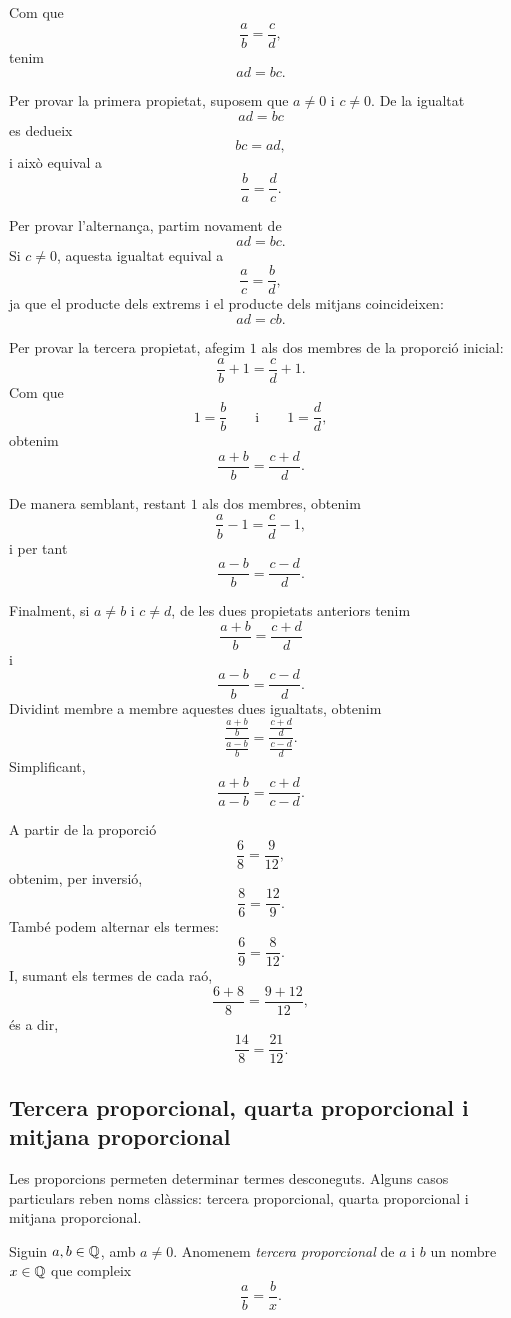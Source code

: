 \begin{prova}
Com que
\[
	\frac{a}{b}=\frac{c}{d},
\]
tenim
\[
	ad=bc.
\]

Per provar la primera propietat, suposem que \(a\neq0\) i \(c\neq0\). De la igualtat
\[
	ad=bc
\]
es dedueix
\[
	bc=ad,
\]
i això equival a
\[
	\frac{b}{a}=\frac{d}{c}.
\]

Per provar l'alternança, partim novament de
\[
	ad=bc.
\]
Si \(c\neq0\), aquesta igualtat equival a
\[
	\frac{a}{c}=\frac{b}{d},
\]
ja que el producte dels extrems i el producte dels mitjans coincideixen:
\[
	ad=cb.
\]

Per provar la tercera propietat, afegim \(1\) als dos membres de la proporció inicial:
\[
	\frac{a}{b}+1=\frac{c}{d}+1.
\]
Com que
\[
	1=\frac{b}{b}
	\qquad\text{i}\qquad
	1=\frac{d}{d},
\]
obtenim
\[
	\frac{a+b}{b}=\frac{c+d}{d}.
\]

De manera semblant, restant \(1\) als dos membres, obtenim
\[
	\frac{a}{b}-1=\frac{c}{d}-1,
\]
i per tant
\[
	\frac{a-b}{b}=\frac{c-d}{d}.
\]

Finalment, si \(a\neq b\) i \(c\neq d\), de les dues propietats anteriors tenim
\[
	\frac{a+b}{b}=\frac{c+d}{d}
\]
i
\[
	\frac{a-b}{b}=\frac{c-d}{d}.
\]
Dividint membre a membre aquestes dues igualtats, obtenim
\[
	\frac{\frac{a+b}{b}}{\frac{a-b}{b}}
	=
	\frac{\frac{c+d}{d}}{\frac{c-d}{d}}.
\]
Simplificant,
\[
	\frac{a+b}{a-b}=\frac{c+d}{c-d}.
\]
\end{prova}

\begin{exemple}
A partir de la proporció
\[
	\frac{6}{8}=\frac{9}{12},
\]
obtenim, per inversió,
\[
	\frac{8}{6}=\frac{12}{9}.
\]
També podem alternar els termes:
\[
	\frac{6}{9}=\frac{8}{12}.
\]
I, sumant els termes de cada raó,
\[
	\frac{6+8}{8}=\frac{9+12}{12},
\]
és a dir,
\[
	\frac{14}{8}=\frac{21}{12}.
\]
\end{exemple}

\subsection{Tercera proporcional, quarta proporcional i mitjana proporcional}

Les proporcions permeten determinar termes desconeguts. Alguns casos particulars reben noms clàssics: tercera proporcional, quarta proporcional i mitjana proporcional.

\begin{definicio}
Siguin \(a,b\in\mathbb{Q}\), amb \(a\neq0\). Anomenem \emph{tercera proporcional} de \(a\) i \(b\) un nombre \(x\in\mathbb{Q}\) que compleix
\[
	\frac{a}{b}=\frac{b}{x}.
\]
\end{definicio}

